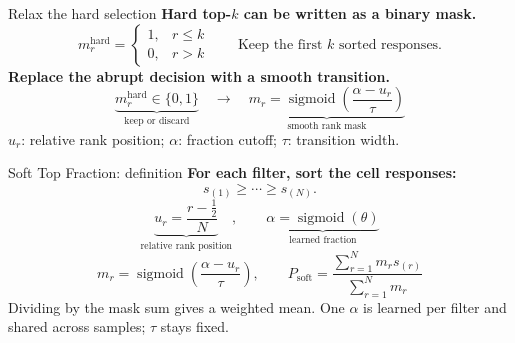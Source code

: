 \begin{frame}{Relax the hard selection}
\textbf{Hard top-$k$ can be written as a binary mask.}
\[m_r^{\mathrm{hard}}=\begin{cases}1,&r\le k\\0,&r>k\end{cases}
\qquad\text{Keep the first $k$ sorted responses.}\]
\vspace{3mm}
\textbf{Replace the abrupt decision with a smooth transition.}
\[\underbrace{m_r^{\mathrm{hard}}\in\{0,1\}}_{\text{keep or discard}}
\quad\longrightarrow\quad
\underbrace{m_r=\operatorname{sigmoid}\!\left(\frac{\alpha-u_r}{\tau}\right)}_{\text{smooth rank mask}}\]
\small $u_r$: relative rank position; $\alpha$: fraction cutoff; $\tau$: transition width.
\end{frame}

\begin{frame}{Soft Top Fraction: definition}
\textbf{For each filter, sort the cell responses:}
\[s_{(1)}\ge\cdots\ge s_{(N)}.\]
\[\underbrace{u_r=\frac{r-\tfrac12}{N}}_{\text{relative rank position}},\qquad
\underbrace{\alpha=\operatorname{sigmoid}(\theta)}_{\text{learned fraction}}\]
\[m_r=\operatorname{sigmoid}\!\left(\frac{\alpha-u_r}{\tau}\right),\qquad
\boxed{P_{\mathrm{soft}}=\frac{\sum_{r=1}^{N}m_rs_{(r)}}{\sum_{r=1}^{N}m_r}}\]
\small Dividing by the mask sum gives a weighted mean. One $\alpha$ is learned per filter and shared across samples; $\tau$ stays fixed.
\end{frame}

